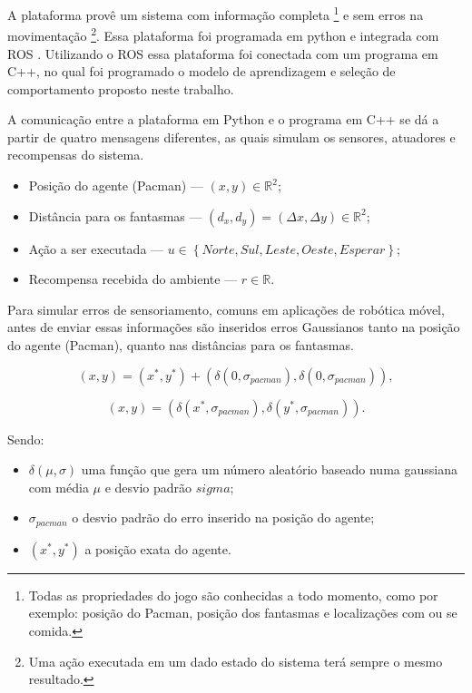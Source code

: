 A plataforma provê um sistema com informação completa%
\footnote{Todas as propriedades do jogo são conhecidas a todo momento, como por exemplo: posição do Pacman, posição dos fantasmas e localizações com ou se comida.%
} e sem erros na movimentação%
\footnote{Uma ação executada em um dado estado do sistema terá sempre o mesmo resultado.%
}. Essa plataforma foi programada em python e integrada com ROS \cite{ROS:1448}. Utilizando o ROS essa plataforma foi conectada com um programa em C++, no qual foi programado o modelo de aprendizagem e seleção de comportamento proposto neste trabalho.

A comunicação entre a plataforma em Python e o programa em C++ se dá a partir de quatro mensagens diferentes, as quais simulam os sensores, atuadores e recompensas do sistema.

\begin{itemize}
	\item Posição do agente (Pacman) --- $ \left( x, y \right) \in \mathbb{R}^2 $;
	\item Distância para os fantasmas --- $ \left( d_x, d_y \right) = \left( \Delta x, \Delta y \right) \in \mathbb{R}^2 $;
	\item Ação a ser executada --- $ u \in \left\{Norte, Sul, Leste, Oeste, Esperar \right\} $;
	\item Recompensa recebida do ambiente --- $ r \in \mathbb{R} $.
\end{itemize}

Para simular erros de sensoriamento, comuns em aplicações de robótica móvel, antes de enviar essas informações são inseridos erros Gaussianos tanto na posição do agente (Pacman), quanto nas distâncias para os fantasmas.

$$
	\left( x, y \right) = \left( x^*, y^* \right) + \left( \delta\left( 0, \sigma_{pacman} \right), \delta\left( 0, \sigma_{pacman} \right) \right),
$$

\begin{equation}
	\left( x, y \right) = \left( \delta\left( x^*, \sigma_{pacman} \right), \delta\left( y^*, \sigma_{pacman} \right) \right).
\end{equation}

Sendo:

\begin{itemize}
	\item $ \delta \left( \mu, \sigma \right) $ uma função que gera um número aleatório baseado numa gaussiana com média $ \mu $ e desvio padrão $ 
sigma $;
	\item $ \sigma_{pacman} $ o desvio padrão do erro inserido na posição do agente;
	\item $ \left( x^*, y^* \right) $ a posição exata do agente.
\end{itemize}

